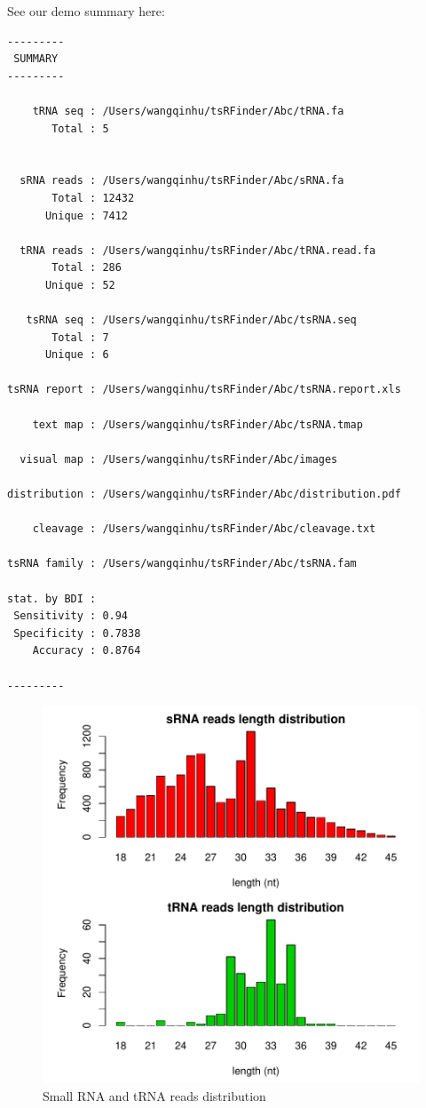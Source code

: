 \documentclass[11pt, a4paper]{article}
\begin{document}
See our demo summary here:

{\small \begin{verbatim}
---------
 SUMMARY 
---------

    tRNA seq : /Users/wangqinhu/tsRFinder/Abc/tRNA.fa
       Total : 5


  sRNA reads : /Users/wangqinhu/tsRFinder/Abc/sRNA.fa
       Total : 12432
      Unique : 7412

  tRNA reads : /Users/wangqinhu/tsRFinder/Abc/tRNA.read.fa
       Total : 286
      Unique : 52

   tsRNA seq : /Users/wangqinhu/tsRFinder/Abc/tsRNA.seq
       Total : 7
      Unique : 6

tsRNA report : /Users/wangqinhu/tsRFinder/Abc/tsRNA.report.xls

    text map : /Users/wangqinhu/tsRFinder/Abc/tsRNA.tmap

  visual map : /Users/wangqinhu/tsRFinder/Abc/images

distribution : /Users/wangqinhu/tsRFinder/Abc/distribution.pdf

    cleavage : /Users/wangqinhu/tsRFinder/Abc/cleavage.txt

tsRNA family : /Users/wangqinhu/tsRFinder/Abc/tsRNA.fam

stat. by BDI :
 Sensitivity : 0.94
 Specificity : 0.7838
    Accuracy : 0.8764

---------
\end{verbatim}
}

\begin{figure}[htbp]
\begin{center}
\includegraphics[width=12cm]{distribution.pdf}
\caption{Small RNA and tRNA reads distribution}
\label{distribution}
\end{center}
\end{figure}
\end{document}
